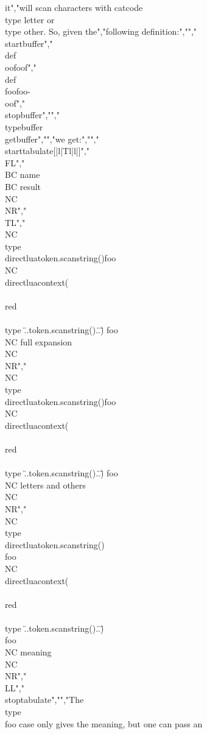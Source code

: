 it","will scan characters with catcode \\type {letter} or \\type {other}. So, given the","following definition:","","\\startbuffer","\\def\\oof{oof}","\\def\\foo{foo-\\oof}","\\stopbuffer","","\\typebuffer \\getbuffer","","we get:","","\\starttabulate[|l|Tl|l|]","\\FL","\\BC name \\BC result \\NC \\NR","\\TL","\\NC \\type {\\directlua{token.scanstring()}{foo}} \\NC \\directlua{context(\"{\\\\red\\\\type {\"..token.scanstring()..\"}}\")} {foo} \\NC full expansion \\NC \\NR","\\NC \\type {\\directlua{token.scanstring()}foo}   \\NC \\directlua{context(\"{\\\\red\\\\type {\"..token.scanstring()..\"}}\")} foo   \\NC letters and others \\NC \\NR","\\NC \\type {\\directlua{token.scanstring()}\\foo}  \\NC \\directlua{context(\"{\\\\red\\\\type {\"..token.scanstring()..\"}}\")}\\foo   \\NC meaning \\NC \\NR","\\LL","\\stoptabulate","","The \\type {\\foo} case only gives the meaning, but one can pass an 